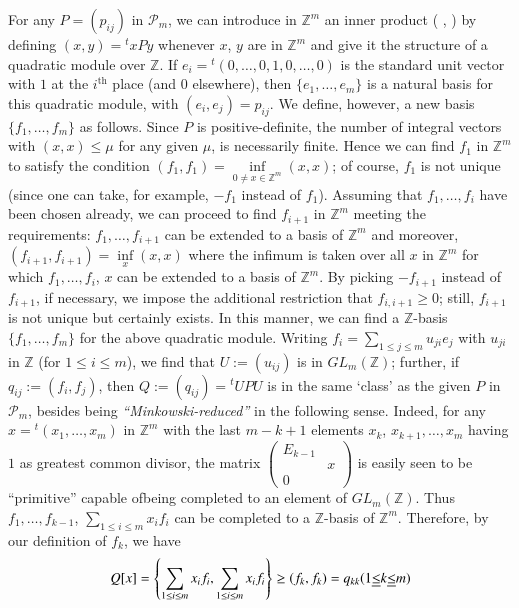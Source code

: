 For any $P=(p_{ij})$ in $\mathscr{P}_{m}$, we can introduce in
$\mathbb{Z}^{m}$ an inner product ( , ) by defining $(x,y)={}^{t}xPy$
whenever $x$, $y$ are in $\mathbb{Z}^{m}$ and give it the structure of
a quadratic module over $\mathbb{Z}$. If
$e_{i}={}^{t}(0,\ldots,0,1,0,\ldots,0)$ is the standard unit vector
with $1$ at the $i^{\text{th}}$ place (and $0$ elsewhere), then
$\{e_{1},\ldots,e_{m}\}$ is a natural basis for this quadratic module,
with $(e_{i},e_{j})=p_{ij}$. We define, however, a new basis
$\{f_{1},\ldots,f_{m}\}$ as follows. Since $P$ is positive-definite,
the number of integral vectors with $(x,x)\leq \mu$ for any given
$\mu$, is necessarily finite. Hence we can find $f_{1}$ in
$\mathbb{Z}^{m}$ to satisfy the condition
$(f_{1},f_{1})=\inf\limits_{0\neq x\in \mathbb{Z}^{m}}(x,x)$; of
course, $f_{1}$ is not unique (since one can take, for example,
$-f_{1}$ instead of $f_{1}$). Assuming that $f_{1},\ldots,f_{i}$ have
been chosen already, we can proceed to find $f_{i+1}$ in
$\mathbb{Z}^{m}$ meeting the requirements: $f_{1},\ldots,f_{i+1}$ can
be extended to a basis of $\mathbb{Z}^{m}$ and moreover,
$(f_{i+1},f_{i+1})=\inf\limits_{x}(x,x)$ where the infimum is taken
over all $x$ in $\mathbb{Z}^{m}$ for which $f_{1},\ldots,f_{i}$, $x$
can be extended to a basis of $\mathbb{Z}^{m}$. By picking $-f_{i+1}$
instead of $f_{i+1}$, if necessary, we impose the additional
restriction that $f_{i,i+1}\geq 0$; still, $f_{i+1}$ is not unique but
certainly exists. In this manner, we can find a $\mathbb{Z}$-basis
$\{f_{1},\ldots,f_{m}\}$ for the above quadratic module. Writing
$f_{i}=\sum\limits_{1\leq j\leq m}u_{ji}e_{j}$ with $u_{ji}$ in
$\mathbb{Z}$ (for $1\leq i\leq m$), we find that $U:=(u_{ij})$ is in
$GL_{m}(\mathbb{Z})$; further, if $q_{ij}:=(f_{i},f_{j})$, then
$Q:=(q_{ij})={}^{t}UPU$ is in the same `class' as the given $P$ in
$\mathscr{P}_{m}$, besides being {\em ``Minkowski-reduced''} in the
following sense. Indeed, for any $x={}^{t}(x_{1},\ldots,x_{m})$ in
$\mathbb{Z}^{m}$ with the last $m-k+1$ elements $x_{k}$,
$x_{k+1},\ldots,x_{m}$ having $1$ as greatest common divisor, the
matrix $\left(\begin{smallmatrix} E_{k-1} & \\ & x\\ 0 & 
\end{smallmatrix}\right)$ is easily seen to be ``primitive'' \ie
capable of\pageoriginale being completed to an element of
$GL_{m}(\mathbb{Z})$. Thus $f_{1},\ldots,f_{k-1}$, $\sum\limits_{1\leq
  i\leq m}x_{i}f_{i}$ can be completed to a $\mathbb{Z}$-basis of
$\mathbb{Z}^{m}$. Therefore, by our definition of $f_{k}$, we have
$$
Q[x]=\left\{\sum_{1\leq i\leq m}x_{i}f_{i},\sum_{1\leq i\leq
  m}x_{i}f_{i}\right\}\geq (f_{k},f_{k})=q_{kk}(1\underline{\leq}k\underline{\leq} m) 
$$

